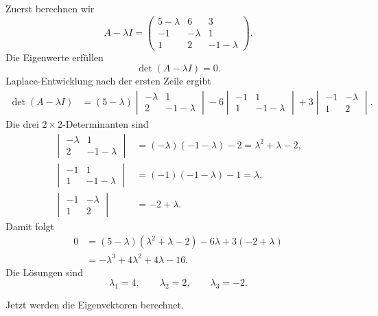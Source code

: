 \begin{calculationbox}
Zuerst berechnen wir
\[
    A-\lambda I=
    \begin{pmatrix}
        5-\lambda&6&3\\
        -1&-\lambda&1\\
        1&2&-1-\lambda
    \end{pmatrix}.
\]
Die Eigenwerte erfüllen
\[
    \det(A-\lambda I)=0.
\]
Laplace-Entwicklung nach der ersten Zeile ergibt
\[
\begin{aligned}
\det(A-\lambda I)
&=(5-\lambda)
\begin{vmatrix}
-\lambda&1\\
2&-1-\lambda
\end{vmatrix}
-6
\begin{vmatrix}
-1&1\\
1&-1-\lambda
\end{vmatrix}
+3
\begin{vmatrix}
-1&-\lambda\\
1&2
\end{vmatrix}.
\end{aligned}
\]
Die drei $2\times2$-Determinanten sind
\[
\begin{aligned}
\begin{vmatrix}
-\lambda&1\\
2&-1-\lambda
\end{vmatrix}
&=(-\lambda)(-1-\lambda)-2
=\lambda^2+\lambda-2,\\
\begin{vmatrix}
-1&1\\
1&-1-\lambda
\end{vmatrix}
&=(-1)(-1-\lambda)-1
=\lambda,\\
\begin{vmatrix}
-1&-\lambda\\
1&2
\end{vmatrix}
&=-2+\lambda.
\end{aligned}
\]
Damit folgt
\[
\begin{aligned}
0&=(5-\lambda)(\lambda^2+\lambda-2)-6\lambda+3(-2+\lambda)\\
&=-\lambda^3+4\lambda^2+4\lambda-16.
\end{aligned}
\]
Die Lösungen sind
\[
    \lambda_1=4,
    \qquad \lambda_2=2,
    \qquad \lambda_3=-2.
\]
\end{calculationbox}

Jetzt werden die Eigenvektoren berechnet.

